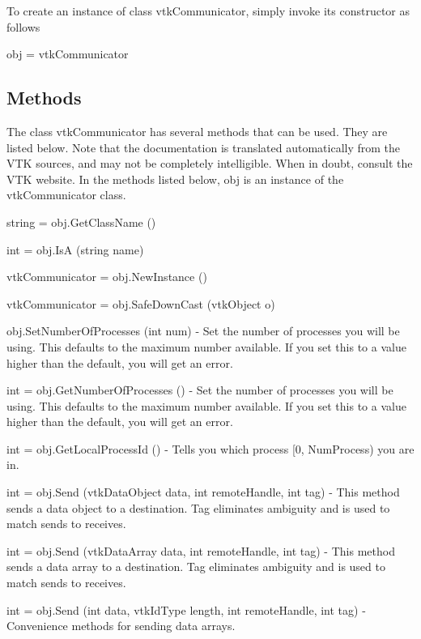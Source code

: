 To create an instance of class vtk\-Communicator, simply invoke its constructor as follows \begin{DoxyVerb}  obj = vtkCommunicator
\end{DoxyVerb}
 \hypertarget{vtkwidgets_vtkxyplotwidget_Methods}{}\subsection{Methods}\label{vtkwidgets_vtkxyplotwidget_Methods}
The class vtk\-Communicator has several methods that can be used. They are listed below. Note that the documentation is translated automatically from the V\-T\-K sources, and may not be completely intelligible. When in doubt, consult the V\-T\-K website. In the methods listed below, {\ttfamily obj} is an instance of the vtk\-Communicator class. 
\begin{DoxyItemize}
\item {\ttfamily string = obj.\-Get\-Class\-Name ()}  
\item {\ttfamily int = obj.\-Is\-A (string name)}  
\item {\ttfamily vtk\-Communicator = obj.\-New\-Instance ()}  
\item {\ttfamily vtk\-Communicator = obj.\-Safe\-Down\-Cast (vtk\-Object o)}  
\item {\ttfamily obj.\-Set\-Number\-Of\-Processes (int num)} -\/ Set the number of processes you will be using. This defaults to the maximum number available. If you set this to a value higher than the default, you will get an error.  
\item {\ttfamily int = obj.\-Get\-Number\-Of\-Processes ()} -\/ Set the number of processes you will be using. This defaults to the maximum number available. If you set this to a value higher than the default, you will get an error.  
\item {\ttfamily int = obj.\-Get\-Local\-Process\-Id ()} -\/ Tells you which process \mbox{[}0, Num\-Process) you are in.  
\item {\ttfamily int = obj.\-Send (vtk\-Data\-Object data, int remote\-Handle, int tag)} -\/ This method sends a data object to a destination. Tag eliminates ambiguity and is used to match sends to receives.  
\item {\ttfamily int = obj.\-Send (vtk\-Data\-Array data, int remote\-Handle, int tag)} -\/ This method sends a data array to a destination. Tag eliminates ambiguity and is used to match sends to receives.  
\item {\ttfamily int = obj.\-Send (int data, vtk\-Id\-Type length, int remote\-Handle, int tag)} -\/ Convenience methods for sending data arrays.  

\end{DoxyItemize}
